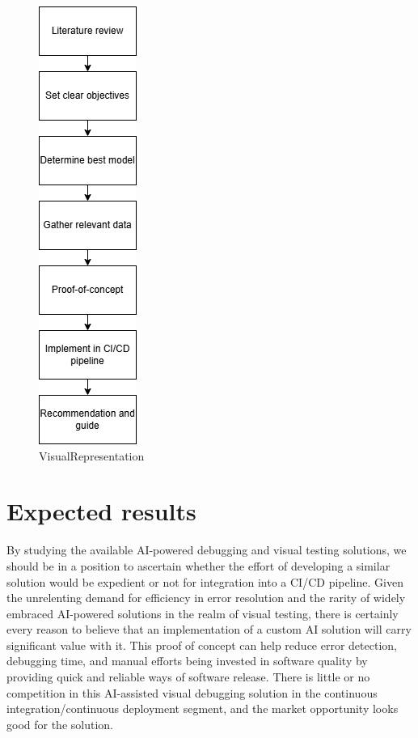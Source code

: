 \begin{figure}[h]
    \centering
    \includegraphics[scale=0.4]{../graphics/BPVOORSTELVITODEDECKER.drawio.png}
    \caption{VisualRepresentation}
    \label{fig:VisualRepresentation}
\end{figure}
\section{Expected results}%
\label{sec:Expected results}

By studying the available AI-powered debugging and visual testing solutions, we should be in a position to ascertain whether the effort of developing a similar solution would be expedient or not for integration into a CI/CD pipeline. Given the unrelenting demand for efficiency in error resolution and the rarity of widely embraced AI-powered solutions in the realm of visual testing, there is certainly every reason to believe that an implementation of a custom AI solution will carry significant value with it.
This proof of concept can help reduce error detection, debugging time, and manual efforts being invested in software quality by providing quick and reliable ways of software release. There is little or no competition in this AI-assisted visual debugging solution in the continuous integration/continuous deployment segment, and the market opportunity looks good for the solution.

